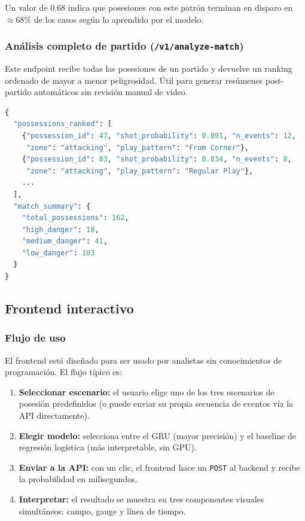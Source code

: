 \documentclass[12pt,a4paper]{article}
\begin{document}
Un valor de $0.68$ indica que posesiones con este patrón terminan en disparo en
$\approx 68\%$ de los casos según lo aprendido por el modelo.

\subsubsection{Análisis completo de partido (\texttt{/v1/analyze-match})}

Este endpoint recibe todas las posesiones de un partido y devuelve un ranking
ordenado de mayor a menor peligrosidad. Útil para generar resúmenes post-partido
automáticos sin revisión manual de video.

\begin{lstlisting}[language=Python, caption={Respuesta de analyze-match (extracto).}]
{
  "possessions_ranked": [
    {"possession_id": 47, "shot_probability": 0.891, "n_events": 12,
     "zone": "attacking", "play_pattern": "From Corner"},
    {"possession_id": 83, "shot_probability": 0.834, "n_events": 8,
     "zone": "attacking", "play_pattern": "Regular Play"},
    ...
  ],
  "match_summary": {
    "total_possessions": 162,
    "high_danger": 18,
    "medium_danger": 41,
    "low_danger": 103
  }
}
\end{lstlisting}

\subsection{Frontend interactivo}

\subsubsection{Flujo de uso}

El frontend está diseñado para ser usado por analistas sin conocimientos de
programación. El flujo típico es:

\begin{enumerate}[leftmargin=1.5em]
    \item \textbf{Seleccionar escenario:} el usuario elige uno de los tres escenarios
          de posesión predefinidos (o puede enviar su propia secuencia de eventos
          vía la API directamente).
    \item \textbf{Elegir modelo:} selecciona entre el GRU (mayor precisión) y el
          baseline de regresión logística (más interpretable, sin GPU).
    \item \textbf{Enviar a la API:} con un clic, el frontend hace un \texttt{POST}
          al backend y recibe la probabilidad en milisegundos.
    \item \textbf{Interpretar:} el resultado se muestra en tres componentes visuales
          simultáneos: campo, gauge y línea de tiempo.
\end{enumerate}
\end{document}
